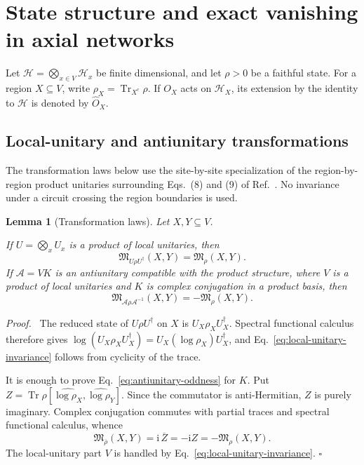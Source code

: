 \documentclass[aps,prb,preprint,nofootinbib,longbibliography]{revtex4-2}
\newcommand{\Tr}{\operatorname{Tr}}
\newcommand{\Mmod}{\mathfrak{M}}
\newcommand{\ii}{\mathrm{i}}
\newtheorem{lemma}[theorem]{Lemma}
\newenvironment{proof}{\par\noindent\textit{Proof.}\ }%
{\unskip\nobreak\hfill\(\square\)\par}
\begin{document}
\section{State structure and exact vanishing in axial networks}
\label{sec:state-functional}

Let
\(
\mathcal H=\bigotimes_{x\in V}\mathcal H_x
\)
be finite dimensional, and let $\rho>0$ be a faithful state.  For a region
$X\subseteq V$, write $\rho_X=\Tr_{X^c}\rho$.  If $O_X$ acts on
$\mathcal H_X$, its extension by the identity to $\mathcal H$ is denoted by
$\widehat O_X$.

\subsection{Local-unitary and antiunitary transformations}

The transformation laws below use the site-by-site specialization of the
region-by-region product unitaries surrounding Eqs.~(8) and (9) of
Ref.~\cite{KimEtAl2022PRB}.  No invariance under a circuit crossing the
region boundaries is used.

\begin{lemma}[Transformation laws]
\label{lem:symmetries}
Let $X,Y\subseteq V$.

If $U=\bigotimes_xU_x$ is a product of local unitaries, then
\begin{equation}
 \Mmod_{U\rho U^\dagger}(X,Y)=\Mmod_\rho(X,Y).
 \label{eq:local-unitary-invariance}
\end{equation}
If $\mathcal A=VK$ is an antiunitary compatible with the product structure,
where $V$ is a product of local unitaries and $K$ is complex conjugation in a
product basis, then
\begin{equation}
 \Mmod_{\mathcal A\rho\mathcal A^{-1}}(X,Y)
 =-\Mmod_\rho(X,Y).
 \label{eq:antiunitary-oddness}
\end{equation}
\end{lemma}

\begin{proof}
The reduced state of $U\rho U^\dagger$ on $X$ is
$U_X\rho_XU_X^\dagger$.  Spectral functional calculus therefore gives
\(
\log(U_X\rho_XU_X^\dagger)=U_X(\log\rho_X)U_X^\dagger
\),
and Eq.~\eqref{eq:local-unitary-invariance} follows from cyclicity of the
trace.

It is enough to prove Eq.~\eqref{eq:antiunitary-oddness} for $K$.  Put
$Z=\Tr\rho[\widehat{\log\rho_X},\widehat{\log\rho_Y}]$.  Since the
commutator is anti-Hermitian, $Z$ is purely imaginary.  Complex conjugation
commutes with partial traces and spectral functional calculus, whence
\begin{equation*}
 \Mmod_{\overline\rho}(X,Y)
 =\ii\,\overline{Z}=-\ii Z=-\Mmod_\rho(X,Y).
\end{equation*}
The local-unitary part $V$ is handled by
Eq.~\eqref{eq:local-unitary-invariance}.
\end{proof}
\end{document}
